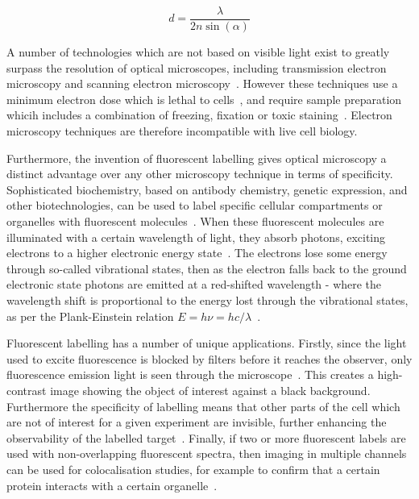 \begin{equation} \label{eq:abbe}
d = \frac{\lambda}{2n\sin\left (\alpha  \right )}\end{equation}

A number of technologies which are not based on visible light exist to greatly surpass the resolution of optical microscopes, including transmission electron microscopy and scanning electron microscopy~\cite{reinhold1931configuration, wells2006early, reimer2013transmission}.
However these techniques use a minimum electron dose which is lethal to cells~\cite{de2016live}, and require sample preparation whicih includes a combination of freezing, fixation or toxic staining~\cite{kuo2007electron}.
Electron microscopy techniques are therefore incompatible with live cell biology.

Furthermore, the invention of fluorescent labelling gives optical microscopy a distinct advantage over any other microscopy technique in terms of specificity. 
Sophisticated biochemistry, based on antibody chemistry, genetic expression, and other biotechnologies, can be used to label specific cellular compartments or organelles with fluorescent molecules~\cite{day2014fluorescent}. 
When these fluorescent molecules are illuminated with a certain wavelength of light, they absorb photons, exciting electrons to a higher electronic energy state~\cite[\textit{ch. 1}]{lakowicz2007principles}. 
The electrons lose some energy through so-called vibrational states, then as the electron falls back to the ground electronic state photons are emitted at a red-shifted wavelength - where the wavelength shift is proportional to the energy lost through the vibrational states, as per the Plank-Einstein relation $E=h\nu=hc/\lambda$~\cite[\textit{ch. 39}]{halliday2010principles}. 

Fluorescent labelling has a number of unique applications. 
Firstly, since the light used to excite fluorescence is blocked by filters before it reaches the observer, only fluorescence emission light is seen through the microscope~\cite{ploem1967use}. 
This creates a high-contrast image showing the object of interest against a black background. 
Furthermore the specificity of labelling means that other parts of the cell which are not of interest for a given experiment are invisible, further enhancing the observability of the labelled target~\cite{day2014fluorescent}.
Finally, if two or more fluorescent labels are used with non-overlapping fluorescent spectra, then imaging in multiple channels can be used for colocalisation studies, for example to confirm that a certain protein interacts with a certain organelle~\cite{dunn2011practical}. 

